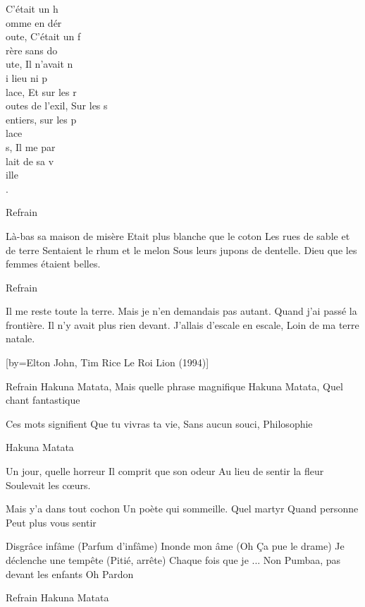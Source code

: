 \beginverse
C'était un h\\[Ré]omme en dér\\[La]oute,
C'était un f\\[Ré]rère sans do\\[La]ute,
Il n'avait n\\[Ré]i lieu ni p\\[La]lace,
Et sur les r\\[Ré]outes de l'exil,
Sur les s\\[Ré]entiers, sur les p\\[Sol]lace\\[La]s,
Il me par\\[Ré]lait de sa v\\[Sol]ille\\[La].
\endverse

\beginverse
Refrain
\endverse

\beginverse
Là-bas sa maison de misère
Etait plus blanche que le coton
Les rues de sable et de terre
Sentaient le rhum et le melon
Sous leurs jupons de dentelle.
Dieu que les femmes étaient belles.
\endverse

\beginverse
Refrain 
\endverse

\beginverse
Il me reste toute la terre.
Mais je n'en demandais pas autant.
Quand j'ai passé la frontière.
Il n'y avait plus rien devant.
J'allais d'escale en escale,
Loin de ma terre natale.
\endverse

[by={Elton John, Tim Rice \- Le Roi Lion (1994)}]

\beginverse
Refrain
Hakuna Matata,
Mais quelle phrase magnifique
Hakuna Matata,
Quel chant fantastique \!
\endverse

\beginverse
Ces mots signifient
Que tu vivras ta vie,
Sans aucun souci,
Philosophie
\endverse

\beginverse
Hakuna Matata
\endverse

\beginverse
Un jour, quelle horreur
Il comprit que son odeur
Au lieu de sentir la fleur
Soulevait les cœurs.
\endverse

\beginverse
Mais y'a dans tout cochon
Un poète qui sommeille.
Quel martyr
Quand personne
Peut plus vous sentir\!
\endverse

\beginverse
Disgrâce infâme (Parfum d'infâme)
Inonde mon âme (Oh \! Ça pue le drame)
Je déclenche une tempête (Pitié, arrête\!)
Chaque fois que je ...
Non Pumbaa, pas devant les enfants\!
Oh\! Pardon\!
\endverse

\beginverse
Refrain
Hakuna Matata\!
\endverse

